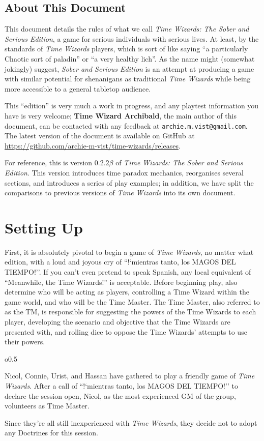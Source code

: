 \documentclass[twoside]{article}
\newcommand{\mientrastanto}{``!`mientras tanto, los MAGOS DEL TIEMPO!''}
\newcommand{\twsse}{\emph{Time Wizards: The Sober and Serious Edition}}
\newcommand{\tw}{\emph{Time Wizards}}
\newcommand{\sse}{\emph{Sober and Serious Edition}}
\newcommand{\vers}{$0.2.2 \beta$}
\newcommand{\namefag}[2][]{{\color{anongreen} \textbf{#2}#1}}
\newenvironment{examplebox}[1]{\begin{tcolorbox}[colback=green!5!white,colframe=green!75!black,title={Example: #1}]}{\end{tcolorbox}\vspace{-30pt}}
\begin{document}
\subsection{About This Document} \label{ssec:rulesintro}
This document details the rules of what we call \twsse{}, a game for serious individuals
with serious lives. At least, by the standards of \tw{} players, which is sort of like saying
``a particularly Chaotic sort of paladin'' or ``a very healthy lich''. As the name might 
(somewhat jokingly) suggest, \sse{} is an attempt at producing a game with similar potential for
shenanigans as traditional \tw{} while being more accessible to a general tabletop audience.

This ``edition'' is very much a work in progress, and any playtest information you have is very
welcome; \namefag{Time Wizard Archibald}, the main author of this document, can be contacted with
any feedback at \verb|archie.m.vist@gmail.com|. The latest version of the document is available
on GitHub at \url{https://github.com/archie-m-vist/time-wizards/releases}.

For reference, this is version \vers{} of \twsse. This version introduces time paradox
mechanics, reorganises several sections, and introduces a series of play examples; in addition,
we have split the comparisons to previous versions of \tw{} into its own document.

\section{Setting Up} \label{sec:setup}
First, it is absolutely pivotal to begin a game of \tw{}, no matter what edition, with a loud
and joyous cry of \mientrastanto. If you can't even pretend to speak Spanish, any local
equivalent of ``Meanwhile, the Time Wizards!'' is acceptable. Before beginning play, also
determine who will be acting as players, controlling a Time Wizard within the game world, and
who will be the Time Master. The Time Master, also referred to as the TM, is responsible for
suggesting the powers of the Time Wizards to each player, developing the scenario and objective
that the Time Wizards are presented with, and rolling dice to oppose the Time Wizards' attempts
to use their powers.

\begin{wrapfigure}{o}{0.5\textwidth}
   \vspace{-10pt}
   \begin{examplebox}{Beginning Play}
      Nicol, Connie, Urist, and Hassan have gathered to play a friendly game of \tw{}. After a
      call of \mientrastanto{} to declare the session open, Nicol, as the most experienced GM of
      the group, volunteers as Time Master.

      Since they're all still inexperienced with \tw{}, they decide not to adopt any Doctrines
      for this session.
   \end{examplebox}
   \vspace{15pt}
\end{wrapfigure}
\end{document}
